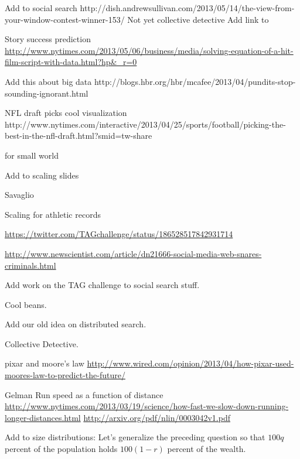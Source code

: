 Add to social search
http://dish.andrewsullivan.com/2013/05/14/the-view-from-your-window-contest-winner-153/
Not yet collective detective
Add link to 

Story success prediction
\url{http://www.nytimes.com/2013/05/06/business/media/solving-equation-of-a-hit-film-script-with-data.html?hp&_r=0}



Add this about big data
http://blogs.hbr.org/hbr/mcafee/2013/04/pundits-stop-sounding-ignorant.html
  


NFL draft picks
cool visualization
http://www.nytimes.com/interactive/2013/04/25/sports/football/picking-the-best-in-the-nfl-draft.html?smid=tw-share
  



  for small world 
  \cite{rutherford2013a}





  Add to scaling slides
  
  Savaglio

  Scaling for athletic records
  



\url{https://twitter.com/TAGchallenge/status/186528517842931714}

\url{http://www.newscientist.com/article/dn21666-social-media-web-snares-criminals.html}

\cite{rutherford2013a}

Add work on the TAG challenge to social search stuff.

Cool beans.

Add our old idea 
on distributed search.

Collective Detective.
  


  
pixar and moore's law
\url{http://www.wired.com/opinion/2013/04/how-pixar-used-moores-law-to-predict-the-future/}


  
Gelman
Run speed as a function of distance
\url{http://www.nytimes.com/2013/03/19/science/how-fast-we-slow-down-running-longer-distances.html}
\url{http://arxiv.org/pdf/nlin/0003042v1.pdf}


  

Add to size distributions:
    Let's generalize the preceding question so
    that $100q$ percent of the population
    holds $100(1-r)$ percent of the wealth.

